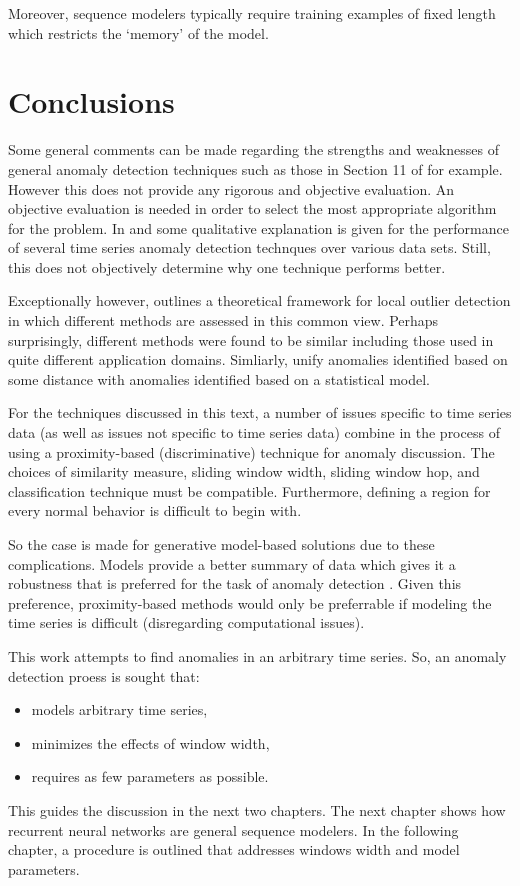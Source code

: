 Moreover, sequence modelers typically require training examples of fixed length which restricts the `memory' of the model.


\section{Conclusions} 

Some general comments can be made regarding the strengths and weaknesses of general anomaly detection techniques such as those in Section 11 of \cite{Chandola2009} for example. However this does not provide any rigorous and objective evaluation. An objective evaluation is needed in order to select the most appropriate algorithm for the problem. In \cite{Cheboli2010} and \cite{Chandola2008} some qualitative explanation is given for the performance of several time series anomaly detection technques over various data sets. Still, this does not objectively determine why one technique performs better.

Exceptionally however, \cite{Schubert2014} outlines a theoretical framework for local outlier detection in which different methods are assessed in this common view. Perhaps surprisingly, different methods were found to be similar including those used in quite different application domains. Simliarly, \cite{knorr1997unified} unify anomalies identified based on some distance with anomalies identified based on a statistical model.

For the techniques discussed in this text, a number of issues specific to time series data (as well as issues not specific to time series data) combine in the process of using a proximity-based (discriminative) technique for anomaly discussion. The choices of similarity measure, sliding window width, sliding window hop, and classification technique must be compatible. Furthermore, defining a region for every normal behavior is difficult to begin with.

So the case is made for generative model-based solutions due to these complications. Models provide a better summary of data which gives it a robustness that is preferred for the task of anomaly detection \cite{Ngkvist2014}. Given this preference, proximity-based methods would only be preferrable if modeling the time series is difficult (disregarding computational issues).

This work attempts to find anomalies in an arbitrary time series. So, an anomaly detection proess is sought that:
\begin{itemize}
\item models arbitrary time series,
\item minimizes the effects of window width,
\item requires as few parameters as possible.
\end{itemize}

This guides the discussion in the next two chapters. The next chapter shows how recurrent neural networks are general sequence modelers. In the following chapter, a procedure is outlined that addresses windows width and model parameters.



